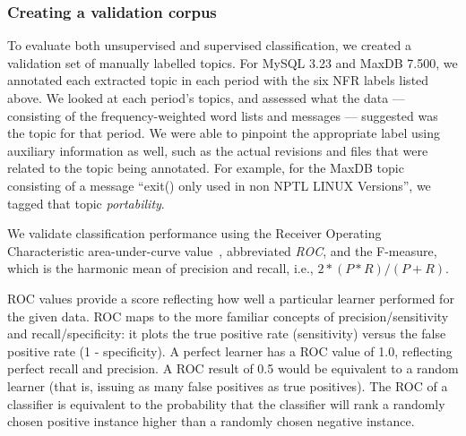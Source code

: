 \documentclass[]{sig-alternate}
\begin{document}
\subsubsection{Creating a validation corpus}
To evaluate both unsupervised and supervised classification, we
created a validation set of manually labelled topics. For MySQL 3.23
and MaxDB 7.500, we annotated each extracted topic in each period with
the six NFR labels listed above.
We looked at each period's topics, and assessed what the data --- consisting of the frequency-weighted word lists and messages --- suggested was the topic for that period. 
We were able to pinpoint the appropriate label using auxiliary information as well, such as the actual revisions and files that were related to the topic being annotated.
For example, for the MaxDB topic consisting of a message ``exit() only used in non NPTL LINUX Versions'', we tagged that topic \emph{portability}. 

We validate classification performance using the Receiver Operating
Characteristic area-under-curve value~\cite{Fawcett2006861},
abbreviated \emph{ROC}, and the F-measure, which is the harmonic mean of precision and recall, i.e., $2 * (P * R) / (P + R)$. 

ROC values provide a score %
 reflecting how well a particular learner performed for the given data. 
ROC maps to the more familiar concepts of precision/sensitivity and recall/specificity: it plots the true positive rate (sensitivity) versus the false positive rate (1 - specificity). 
A perfect learner has a ROC value of 1.0, reflecting perfect recall and precision. 
A ROC result of 0.5 would be equivalent to a random learner (that is, issuing as many false positives as true positives). 
The %
ROC of a classifier is equivalent to the probability that the classifier will rank a randomly chosen positive instance higher than a randomly chosen negative instance.
\end{document}
